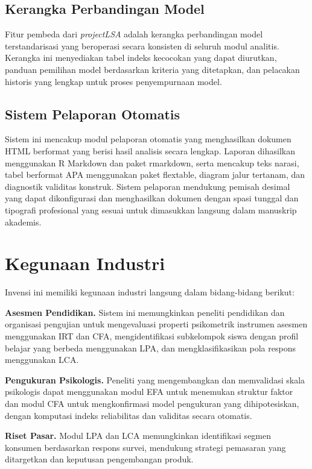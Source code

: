 \documentclass[12pt,a4paper]{article}
\begin{document}
\subsection{Kerangka Perbandingan Model}

Fitur pembeda dari \textit{projectLSA} adalah kerangka perbandingan model terstandarisasi yang beroperasi secara konsisten di seluruh modul analitis. Kerangka ini menyediakan tabel indeks kecocokan yang dapat diurutkan, panduan pemilihan model berdasarkan kriteria yang ditetapkan, dan pelacakan historis yang lengkap untuk proses penyempurnaan model.

\subsection{Sistem Pelaporan Otomatis}

Sistem ini mencakup modul pelaporan otomatis yang menghasilkan dokumen HTML berformat yang berisi hasil analisis secara lengkap. Laporan dihasilkan menggunakan R Markdown dan paket rmarkdown, serta mencakup teks narasi, tabel berformat APA menggunakan paket flextable, diagram jalur tertanam, dan diagnostik validitas konstruk. Sistem pelaporan mendukung pemisah desimal yang dapat dikonfigurasi dan menghasilkan dokumen dengan spasi tunggal dan tipografi profesional yang sesuai untuk dimasukkan langsung dalam manuskrip akademis.

\section{Kegunaan Industri}

Invensi ini memiliki kegunaan industri langsung dalam bidang-bidang berikut:

\textbf{Asesmen Pendidikan.} Sistem ini memungkinkan peneliti pendidikan dan organisasi pengujian untuk mengevaluasi properti psikometrik instrumen asesmen menggunakan IRT dan CFA, mengidentifikasi subkelompok siswa dengan profil belajar yang berbeda menggunakan LPA, dan mengklasifikasikan pola respons menggunakan LCA.

\textbf{Pengukuran Psikologis.} Peneliti yang mengembangkan dan memvalidasi skala psikologis dapat menggunakan modul EFA untuk menemukan struktur faktor dan modul CFA untuk mengkonfirmasi model pengukuran yang dihipotesiskan, dengan komputasi indeks reliabilitas dan validitas secara otomatis.

\textbf{Riset Pasar.} Modul LPA dan LCA memungkinkan identifikasi segmen konsumen berdasarkan respons survei, mendukung strategi pemasaran yang ditargetkan dan keputusan pengembangan produk.
\end{document}
